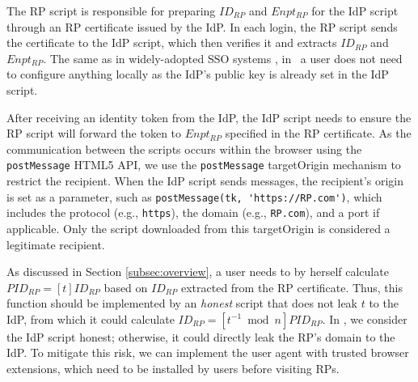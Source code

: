 
The RP script is responsible for preparing $ID_{RP}$ and $Enpt_{RP}$ for the IdP script through an RP certificate issued by the IdP. %
In each login, the RP script sends the certificate to the IdP script, which then verifies it and extracts $ID_{RP}$ and $Enpt_{RP}$.
The same as in widely-adopted SSO systems \cite{OpenIDConnect, rfc6749, SAML, SAMLIdentifier}, in \usso\ a user does not need to configure anything locally as the IdP's public key is already set in the IdP script.

After receiving an identity token from the IdP, the IdP script needs to ensure the RP script will forward the token to $Enpt_{RP}$ %
specified in the RP certificate.
As the communication between the scripts occurs within the browser using the \verb+postMessage+ HTML5 API, %
we use the \verb+postMessage+ targetOrigin mechanism \cite{postm-targeto} to restrict the recipient. %
 When the IdP script sends messages, the recipient's origin is set as a parameter, such as \verb+postMessage(tk, 'https://RP.com')+, which includes the protocol (e.g., \verb+https+), the domain (e.g., \verb+RP.com+), and a port if applicable.
Only the script downloaded from this targetOrigin is considered a legitimate recipient.


\newc
As discussed in Section \ref{subsec:overview}, a user needs to by herself calculate $PID_{RP} = [t]ID_{RP}$ based on $ID_{RP}$ extracted from the RP certificate. Thus, this function should be implemented by an \emph{honest} script that does not leak $t$ to the IdP, from which it could calculate $ID_{RP} = [t^{-1}\bmod n]PID_{RP}$. In \usso, we consider the IdP script honest; otherwise, it could directly leak the RP's domain to the IdP.
To mitigate this risk, we can implement the user agent with trusted browser extensions, which need to be installed by users before visiting RPs.
\oldc

